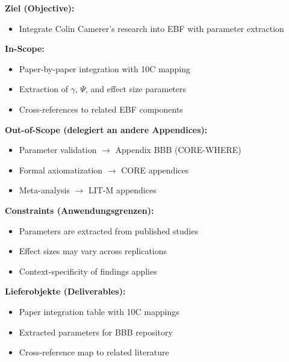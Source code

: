 
\begin{tcolorbox}[
    colback=orange!5!white,
    colframe=orange!75!black,
    title={\textbf{Appendix Scope: Ziel / In-Scope / Out-of-Scope / Constraints}},
    fonttitle=\bfseries
]

\textbf{Ziel (Objective):}
\begin{itemize}[nosep]
    \item Integrate Colin Camerer's research into EBF with parameter extraction
\end{itemize}

\textbf{In-Scope:}
\begin{itemize}[nosep]
    \item Paper-by-paper integration with 10C mapping
    \item Extraction of $\gamma$, $\Psi$, and effect size parameters
    \item Cross-references to related EBF components
\end{itemize}

\textbf{Out-of-Scope (delegiert an andere Appendices):}
\begin{itemize}[nosep]
    \item Parameter validation $\rightarrow$ Appendix BBB (CORE-WHERE)
    \item Formal axiomatization $\rightarrow$ CORE appendices
    \item Meta-analysis $\rightarrow$ LIT-M appendices
\end{itemize}

\textbf{Constraints (Anwendungsgrenzen):}
\begin{itemize}[nosep]
    \item Parameters are extracted from published studies
    \item Effect sizes may vary across replications
    \item Context-specificity of findings applies
\end{itemize}

\textbf{Lieferobjekte (Deliverables):}
\begin{itemize}[nosep]
    \item Paper integration table with 10C mappings
    \item Extracted parameters for BBB repository
    \item Cross-reference map to related literature
\end{itemize}

\end{tcolorbox}

